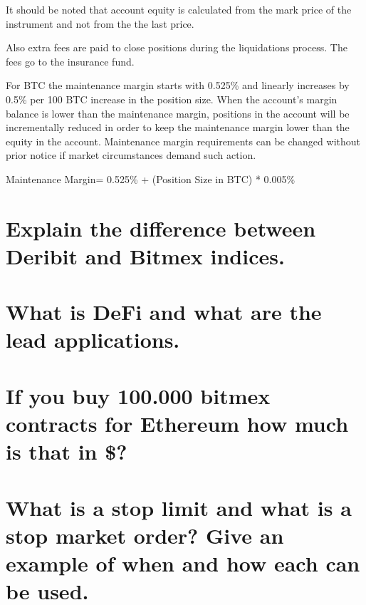 It should be noted that account equity is calculated from the mark price of the instrument and not from the the last price.

Also extra fees are paid to close positions during the liquidations process. The fees go to the insurance fund.

For BTC the maintenance margin starts with 0.525\% and linearly increases by 0.5\% per 100 BTC increase in the position size. When the account's margin balance is lower than the maintenance margin, positions in the account will be incrementally reduced in order to keep the maintenance margin lower than the equity in the account. Maintenance margin requirements can be changed without prior notice if market circumstances demand such action.

 

Maintenance Margin= 0.525\% + (Position Size in BTC) * 0.005\%

\section{ Explain the difference between Deribit and Bitmex indices.}
    
    
    \section{ What is DeFi and what are the lead applications.}
    \section{ If you buy 100.000 bitmex contracts for Ethereum how much is that in \$?}
    \section{ What is a stop limit and what is a stop market order? Give an example of when and how each can be used.}